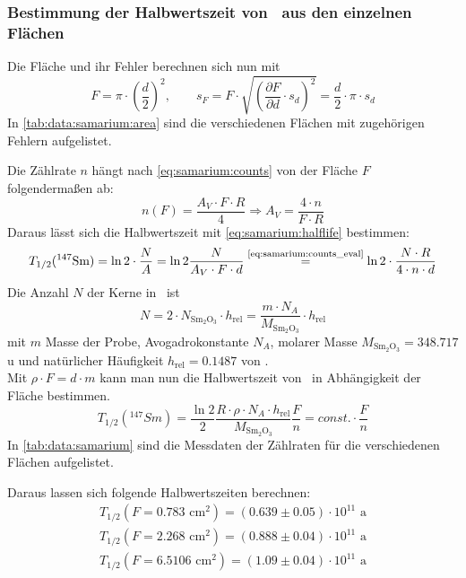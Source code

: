 \subsubsection{Bestimmung der Halbwertszeit von \samarium ~aus den einzelnen Flächen}
\label{subsub:samarium:halflife:single}
Die Fläche und ihr Fehler berechnen sich nun mit
\begin{equation}
  F = \pi  \cdot \left( \frac{d}{2} \right)^2 , \qquad 
  s_F = F \cdot \sqrt{ \left( \frac{\partial F}{\partial d} \cdot s_d \right)^2 } = \frac{d}{2} \cdot \pi \cdot s_d
\end{equation}
In \autoref{tab:data:samarium:area} sind die verschiedenen Flächen mit zugehörigen Fehlern aufgelistet.

Die Zählrate $n$ hängt nach \autoref{eq:samarium:counts} von der Fläche $F$ folgendermaßen ab:
\begin{equation}
\label{eq:samarium:counts_eval}
  n(F) = \frac{A_V \cdot F \cdot R}{4} \Rightarrow A_V = \frac{4 \cdot n}{F \cdot R}
\end{equation}
Daraus lässt sich die Halbwertszeit mit \autoref{eq:samarium:halflife} bestimmen:
\begin{equation}
  T_{1/2}({}^{147}\text{Sm}) = \ln 2 \cdot \frac{N}{A} = \ln 2 \frac{N}{A_V \cdot F \cdot d} \overset{\text{\eqref{eq:samarium:counts_eval}}}{=} 
  \ln 2 \cdot \frac{N \cdot R}{4 \cdot n \cdot d}
\end{equation}
Die Anzahl $N$ der Kerne in \samarium\, ist
\begin{equation}
  N = 2 \cdot N_{\text{Sm}_2\text{O}_3} \cdot h_{\text{rel}} = \frac{m \cdot N_A}{M_{\text{Sm}_2\text{O}_3}} \cdot h_{\text{rel}}
\end{equation}
mit $m$ Masse der Probe, Avogadrokonstante $N_A$, molarer Masse $M_{\text{Sm}_2\text{O}_3}=348.717$u und natürlicher Häufigkeit $h_{\text{rel}} = 0.1487$ von \samarium. \\
Mit $\rho \cdot F = d \cdot m$ kann man nun die Halbwertszeit von \samarium\, in Abhängigkeit der Fläche bestimmen.
\begin{equation}
  \label{eq:samarium:halflife_eval}
  T_{1/2}({}^{147}Sm) = \frac{\ln 2}{2} \frac{R \cdot \rho \cdot N_A \cdot h_{\text{rel}}}{M_{\text{Sm}_2\text{O}_3}} \frac{F}{n} = const. \cdot \frac{F}{n}
\end{equation}
In \autoref{tab:data:samarium} sind die Messdaten der Zählraten für die verschiedenen Flächen aufgelistet.

Daraus lassen sich folgende Halbwertszeiten berechnen:
\begin{gather}
  T_{1/2}(F=0.783 \text{ cm}^2) = (0.639 \pm 0.05)\cdot 10^{11} \text{ a} \\
  T_{1/2}(F=2.268 \text{ cm}^2) = (0.888 \pm 0.04)\cdot 10^{11} \text{ a}\\
  T_{1/2}(F=6.5106 \text{ cm}^2) = (1.09 \pm 0.04)\cdot 10^{11} \text{ a}
\end{gather}
